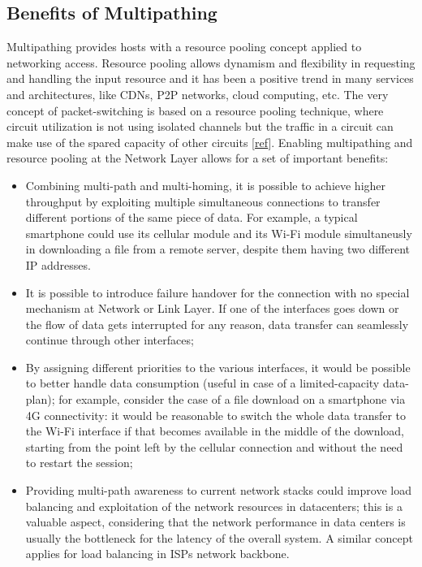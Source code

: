\subsection{Benefits of Multipathing}
Multipathing provides hosts with a resource pooling concept applied to networking access. Resource pooling allows dynamism and flexibility in requesting and handling the input resource and it has been a positive trend in many services and architectures, like CDNs, P2P networks, cloud computing, etc. The very concept of packet-switching is based on a resource pooling technique, where circuit utilization is not using isolated channels but the traffic in a circuit can make use of the spared capacity of other circuits [\href{https://www.cl.cam.ac.uk/~as2330/docs/multipath-survey.pdf}{ref}]. Enabling multipathing and resource pooling at the Network Layer allows for a set of important benefits:
\begin{itemize}
  \item Combining multi-path and multi-homing, it is possible to achieve higher throughput by exploiting multiple simultaneous connections to transfer different portions of the same piece of data. For example, a typical smartphone could use its cellular module and its Wi-Fi module simultaneusly in downloading a file from a remote server, despite them having two different IP addresses.
  \item It is possible to introduce failure handover for the connection with no special mechanism at Network or Link Layer. If one of the interfaces goes down or the flow of data gets interrupted for any reason, data transfer can seamlessly continue through other interfaces;
  \item By assigning different priorities to the various interfaces, it would be possible to better handle data consumption (useful in case of a limited-capacity data-plan); for example, consider the case of a file download on a smartphone via 4G connectivity: it would be reasonable to switch the whole data transfer to the Wi-Fi interface if that becomes available in the middle of the download, starting from the point left by the cellular connection and without the need to restart the session;
  \item Providing multi-path awareness to current network stacks could improve load balancing and exploitation of the network resources in datacenters; this is a valuable aspect, considering that the network performance in data centers is usually the bottleneck for the latency of the overall system. A similar concept applies for load balancing in ISPs network backbone.
\end{itemize}

